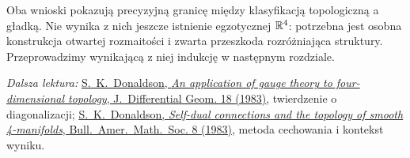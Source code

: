 Oba wnioski pokazują precyzyjną granicę między
klasyfikacją topologiczną a gładką. Nie wynika z nich
jeszcze istnienie egzotycznej $\mathbb{R}^4$: potrzebna jest
osobna konstrukcja otwartej rozmaitości i zwarta
przeszkoda rozróżniająca struktury. Przeprowadzimy
wynikającą z niej indukcję w następnym rozdziale.

\par\smallskip
{\footnotesize\noindent\emph{Dalsza lektura:}
\href{https://doi.org/10.4310/jdg/1214437665}
{S.~K.~Donaldson, \emph{An application of gauge theory to
four-dimensional topology}, J.~Differential Geom. 18 (1983)},
twierdzenie o diagonalizacji;
\href{https://doi.org/10.1090/S0273-0979-1983-15090-5}
{S.~K.~Donaldson, \emph{Self-dual connections and the topology
of smooth 4-manifolds}, Bull.~Amer.~Math.~Soc. 8 (1983)},
metoda cechowania i kontekst wyniku.\par}
